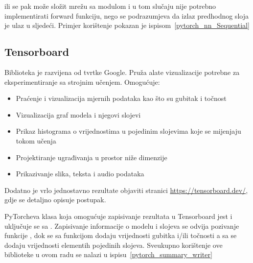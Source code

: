 ili se pak može složit mrežu sa  modulom i u tom slučaju nije potrebno implementirati forward funkciju, nego se podrazumjeva da izlaz predhodnog sloja je ulaz u sljedeći. Primjer korištenje  pokazan je ispisom~\ref{pytorch_nn_Sequential}


\subsection{Tensorboard}
Biblioteka je razvijena od tvrtke Google. Pruža alate vizualizacije potrebne za eksperimentiranje sa strojnim učenjem. 
Omogućuje:
\begin{itemize}
	\item Praćenje i vizualizacija mjernih podataka kao što su gubitak i točnost
	\item Vizualizacija graf modela i njegovi slojevi
	\item Prikaz histograma o vrijednostima u pojedinim slojevima koje se mijenjaju tokom učenja
	\item Projektiranje ugrađivanja u prostor niže dimenzije
	\item Prikazivanje slika, teksta i audio podataka
\end{itemize}
Dodatno je vrlo jednostavno rezultate objaviti stranici \url{https://tensorboard.dev/}, gdje se detaljno opisuje postupak.

PyTorcheva klasa koja omogućuje zapisivanje rezultata u Tensorboard jest  i uključuje se sa . Zapisivanje informacije o modelu i slojeva se odvija pozivanje funkcije , dok se sa funkcijom  dodaju vrijednosti gubitka i/ili točnosti a sa  se dodaju vrijednosti elementih pojedinih slojeva. Sveukupno korištenje ove biblioteke u ovom radu se nalazi u ispisu~\ref{pytorch_summary_writer}
{}

